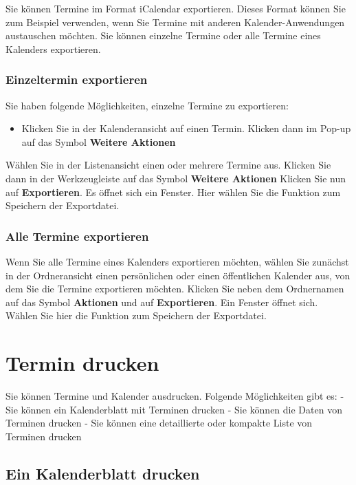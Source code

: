\documentclass[
  letterpaper,
  DIV=11,
  numbers=noendperiod]{scrreprt}
\providecommand{\tightlist}{%
  \setlength{\itemsep}{0pt}\setlength{\parskip}{0pt}}\usepackage{longtable,booktabs,array}
\begin{document}
Sie können Termine im Format iCalendar exportieren. Dieses Format können
Sie zum Beispiel verwenden, wenn Sie Termine mit anderen
Kalender-Anwendungen austauschen möchten. Sie können einzelne Termine
oder alle Termine eines Kalenders exportieren.

\subsubsection{Einzeltermin exportieren}\label{einzeltermin-exportieren}

Sie haben folgende Möglichkeiten, einzelne Termine zu exportieren:

\begin{itemize}
\tightlist
\item
  Klicken Sie in der Kalenderansicht auf einen Termin. Klicken dann im
  Pop-up auf das Symbol \textbf{Weitere Aktionen}
\end{itemize}

Wählen Sie in der Listenansicht einen oder mehrere Termine aus. Klicken
Sie dann in der Werkzeugleiste auf das Symbol \textbf{Weitere Aktionen}
Klicken Sie nun auf \textbf{Exportieren}. Es öffnet sich ein Fenster.
Hier wählen Sie die Funktion zum Speichern der Exportdatei.

\subsubsection{Alle Termine exportieren}\label{alle-termine-exportieren}

Wenn Sie alle Termine eines Kalenders exportieren möchten, wählen Sie
zunächst in der Ordneransicht einen persönlichen oder einen öffentlichen
Kalender aus, von dem Sie die Termine exportieren möchten. Klicken Sie
neben dem Ordnernamen auf das Symbol \textbf{Aktionen} und auf
\textbf{Exportieren}. Ein Fenster öffnet sich. Wählen Sie hier die
Funktion zum Speichern der Exportdatei.

\section{Termin drucken}\label{termin-drucken}

Sie können Termine und Kalender ausdrucken. Folgende Möglichkeiten gibt
es: - Sie können ein Kalenderblatt mit Terminen drucken - Sie können die
Daten von Terminen drucken - Sie können eine detaillierte oder kompakte
Liste von Terminen drucken

\subsection{Ein Kalenderblatt drucken}\label{ein-kalenderblatt-drucken}
\end{document}
